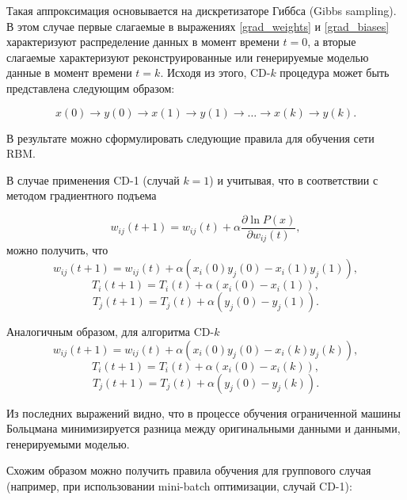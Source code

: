 Такая аппроксимация основывается на дискретизаторе Гиббса (Gibbs sampling). В этом случае первые слагаемые в выражениях \ref{grad_weights} и \ref{grad_biases} характеризуют распределение данных в момент времени $t=0$, а вторые слагаемые характеризуют реконструированные или генерируемые моделью данные в момент времени $t=k$. Исходя из этого, CD-$k$ процедура может быть представлена следующим образом:
	
\begin{equation}
	x(0) \rightarrow y(0) \rightarrow x(1) \rightarrow y(1) \rightarrow \ldots \rightarrow x(k) \rightarrow y(k).
\end{equation}
	
В результате можно сформулировать следующие правила для обучения сети RBM. 

В случае применения CD-1 (случай $k=1$) и учитывая, что в соответствии с методом градиентного подъема
	
\begin{equation*}
	w_{ij}(t+1)=w_{ij}(t)+\alpha\frac{\partial \ln P(x)}{\partial w_{ij}(t)},
\end{equation*}	 
можно получить, что
\begin{equation*}
		w_{ij}(t+1)=w_{ij}(t)+\alpha(x_i(0)y_j(0)-x_i(1)y_j(1)),
\end{equation*}
\begin{equation*}		
		T_i(t+1)=T_i(t)+\alpha(x_i(0)-x_i(1)),
\end{equation*}
\begin{equation*}		
		T_j(t+1)=T_j(t)+\alpha(y_j(0)-y_j(1)).
\end{equation*}		
	
	Аналогичным образом, для алгоритма  CD-$k$
\begin{equation*}
		w_{ij}(t+1)=w_{ij}(t)+\alpha(x_i(0)y_j(0)-x_i(k)y_j(k)),
\end{equation*} 
\begin{equation*}	
		T_i(t+1)=T_i(t)+\alpha(x_i(0)-x_i(k)),
\end{equation*} 
\begin{equation*}		
		T_j(t+1)=T_j(t)+\alpha(y_j(0)-y_j(k)).
\end{equation*} 
	
Из последних выражений видно, что в процессе обучения ограниченной машины Больцмана минимизируется разница между оригинальными данными и данными, генерируемыми моделью.

Схожим образом можно получить правила обучения для группового случая (например, при использовании mini-batch оптимизации, случай \mbox{CD-1}):

